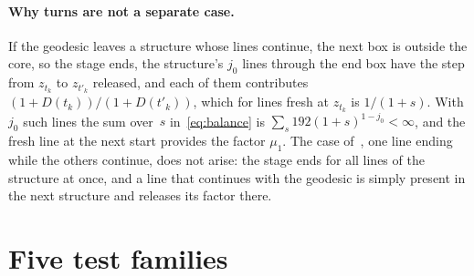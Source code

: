 \documentclass[11pt,letterpaper]{article}
\begin{document}
\paragraph{Why turns are not a separate case.} If the geodesic leaves a structure whose lines continue, the next box is outside the core, so the stage ends, the structure's $j_0$ lines through the end box have the step from $z_{t_k}$ to $z_{t'_k}$ released, and each of them contributes $(1+D(t_k))/(1+D(t'_k))$, which for lines fresh at $z_{t_k}$ is $1/(1+s)$. With $j_0$ such lines the sum over~$s$ in~\eqref{eq:balance} is $\sum_s192(1+s)^{1-j_0}<\infty$, and the fresh line at the next start provides the factor $\mu_1$. The case of~\cite[Section~8]{DEC26}, one line ending while the others continue, does not arise: the stage ends for all lines of the structure at once, and a line that continues with the geodesic is simply present in the next structure and releases its factor there.

\section{Five test families}
\label{sec:tests}
\end{document}
